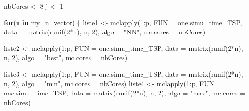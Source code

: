 \documentclass[
]{article}
\newenvironment{Shaded}{\begin{snugshade}}{\end{snugshade}}
\newcommand{\AttributeTok}[1]{\textcolor[rgb]{0.77,0.63,0.00}{#1}}
\newcommand{\ControlFlowTok}[1]{\textcolor[rgb]{0.13,0.29,0.53}{\textbf{#1}}}
\newcommand{\DecValTok}[1]{\textcolor[rgb]{0.00,0.00,0.81}{#1}}
\newcommand{\FunctionTok}[1]{\textcolor[rgb]{0.00,0.00,0.00}{#1}}
\newcommand{\NormalTok}[1]{#1}
\newcommand{\OtherTok}[1]{\textcolor[rgb]{0.56,0.35,0.01}{#1}}
\newcommand{\SpecialCharTok}[1]{\textcolor[rgb]{0.00,0.00,0.00}{#1}}
\newcommand{\StringTok}[1]{\textcolor[rgb]{0.31,0.60,0.02}{#1}}
\begin{document}
\begin{Shaded}
\begin{Highlighting}[]
\NormalTok{nbCores }\OtherTok{\textless{}{-}} \DecValTok{8}
\NormalTok{j }\OtherTok{\textless{}{-}} \DecValTok{1}

\ControlFlowTok{for}\NormalTok{(n }\ControlFlowTok{in}\NormalTok{ my\_n\_vector)}
\NormalTok{\{}
\NormalTok{  liste1 }\OtherTok{\textless{}{-}} \FunctionTok{mclapply}\NormalTok{(}\DecValTok{1}\SpecialCharTok{:}\NormalTok{p, }\AttributeTok{FUN =}\NormalTok{ one.simu\_time\_TSP,}
                      \AttributeTok{data =} \FunctionTok{matrix}\NormalTok{(}\FunctionTok{runif}\NormalTok{(}\DecValTok{2}\SpecialCharTok{*}\NormalTok{n), n, }\DecValTok{2}\NormalTok{),}
                     \AttributeTok{algo =} \StringTok{"NN"}\NormalTok{,}
                     \AttributeTok{mc.cores =}\NormalTok{ nbCores)}

\NormalTok{  liste2 }\OtherTok{\textless{}{-}} \FunctionTok{mclapply}\NormalTok{(}\DecValTok{1}\SpecialCharTok{:}\NormalTok{p, }\AttributeTok{FUN =}\NormalTok{ one.simu\_time\_TSP,}
                     \AttributeTok{data =} \FunctionTok{matrix}\NormalTok{(}\FunctionTok{runif}\NormalTok{(}\DecValTok{2}\SpecialCharTok{*}\NormalTok{n), n, }\DecValTok{2}\NormalTok{),}
                     \AttributeTok{algo =} \StringTok{"best"}\NormalTok{,}
                     \AttributeTok{mc.cores =}\NormalTok{ nbCores)}

\NormalTok{  liste3 }\OtherTok{\textless{}{-}} \FunctionTok{mclapply}\NormalTok{(}\DecValTok{1}\SpecialCharTok{:}\NormalTok{p, }\AttributeTok{FUN =}\NormalTok{ one.simu\_time\_TSP,}
                     \AttributeTok{data =} \FunctionTok{matrix}\NormalTok{(}\FunctionTok{runif}\NormalTok{(}\DecValTok{2}\SpecialCharTok{*}\NormalTok{n), n, }\DecValTok{2}\NormalTok{),}
                     \AttributeTok{algo =} \StringTok{"min"}\NormalTok{,}
                     \AttributeTok{mc.cores =}\NormalTok{ nbCores)}
\NormalTok{  liste4 }\OtherTok{\textless{}{-}} \FunctionTok{mclapply}\NormalTok{(}\DecValTok{1}\SpecialCharTok{:}\NormalTok{p, }\AttributeTok{FUN =}\NormalTok{ one.simu\_time\_TSP,}
                     \AttributeTok{data =} \FunctionTok{matrix}\NormalTok{(}\FunctionTok{runif}\NormalTok{(}\DecValTok{2}\SpecialCharTok{*}\NormalTok{n), n, }\DecValTok{2}\NormalTok{),}
                     \AttributeTok{algo =} \StringTok{"max"}\NormalTok{,}
                     \AttributeTok{mc.cores =}\NormalTok{ nbCores)}


\end{Highlighting}
\end{Shaded}
\end{document}
